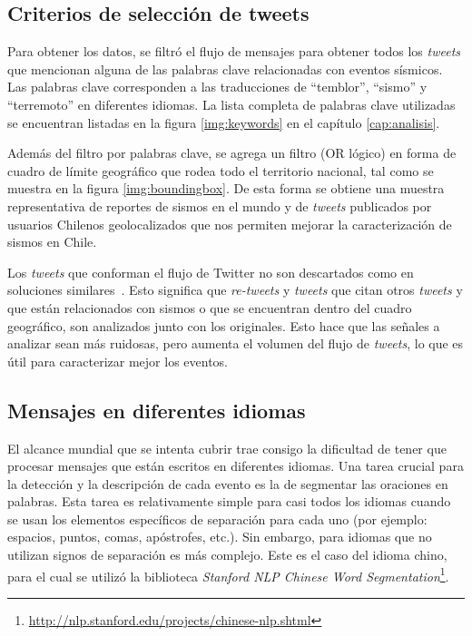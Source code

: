 \subsection{Criterios de selección de tweets}

Para obtener los datos, se filtró el flujo de mensajes para obtener todos los \textit{tweets} que mencionan alguna de las palabras clave relacionadas con eventos sísmicos. 
%
Las palabras clave corresponden a las traducciones de ``temblor'', ``sismo'' y ``terremoto'' en diferentes idiomas. 
%
La lista completa de palabras clave utilizadas se encuentran listadas en la figura \ref{img:keywords} en el capítulo \ref{cap:analisis}. 

%
Además del filtro por palabras clave, se agrega un filtro (OR lógico) en forma de cuadro de límite geográfico que rodea todo el territorio nacional, tal como se muestra en la figura \ref{img:boundingbox}.
%
De esta forma se obtiene una muestra representativa de reportes de sismos en el mundo y de \textit{tweets} publicados por usuarios Chilenos geolocalizados que nos permiten mejorar la caracterización de sismos en Chile.


Los \textit{tweets} que conforman el flujo de Twitter no son descartados como en soluciones similares~\cite{avvenuti2014ears}. 
%
Esto significa que \textit{re-tweets} y \textit{tweets} que citan otros \textit{tweets} y que están relacionados con sismos o que se encuentran dentro del cuadro geográfico, son analizados junto con los originales. 
%
Esto hace que las señales a analizar sean más ruidosas, pero aumenta el volumen del flujo de \textit{tweets}, lo que es útil para caracterizar mejor los eventos. 

\subsection{Mensajes en diferentes idiomas}
El alcance mundial que se intenta cubrir trae consigo la dificultad de tener que procesar mensajes que están escritos en diferentes idiomas. 
%
Una tarea crucial para la detección y la descripción de cada evento es la de segmentar las oraciones en palabras.
%
Esta tarea es relativamente simple para casi todos los idiomas cuando se usan los elementos específicos de separación para cada uno (por ejemplo: espacios, puntos, comas, apóstrofes, etc.).
% 
Sin embargo, para idiomas que no utilizan signos de separación es más complejo. 
%
Este es el caso del idioma chino, para el cual se utilizó la biblioteca {\em Stanford NLP Chinese Word Segmentation}\footnote{\url{http://nlp.stanford.edu/projects/chinese-nlp.shtml}}.

